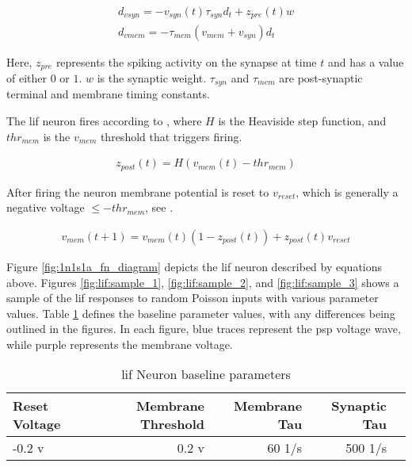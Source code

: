\begin{align}
d_{vsyn} = -v_{syn}(t) \tau_{syn} d_t + z_{pre}(t) w \label{eq:lif:psp} \\
d_{vmem} = -\tau_{mem} (v_{mem} + v_{syn}) d_t \label{eq:lif:v}
\end{align}

Here, $z_{pre}$ represents the spiking activity on the synapse at time $t$ and
has a value of either $0$ or $1$. $w$ is the synaptic weight. $\tau_{syn}$ and
$\tau_{mem}$ are post-synaptic terminal and membrane timing constants.

The \gls{lif} neuron fires according to , where $H$ is the
Heaviside step function, and $thr_{mem}$ is the $v_{mem}$ threshold that
triggers firing.

\begin{align}
z_{post}(t) = H(v_{mem}(t) - thr_{mem}) \label{eq:lif:fire}
\end{align}

After firing the neuron membrane potential is reset to $v_{reset}$, which is
generally a negative voltage $\leq -thr_{mem}$, see .

\begin{align}
v_{mem}(t+1) = v_{mem}(t)(1 - z_{post}(t)) + z_{post}(t)v_{reset} \label{eq:lif:reset}
\end{align}

Figure \ref{fig:1n1s1a_fn_diagram} depicts the \gls{lif} neuron described by
equations above. Figures \ref{fig:lif:sample_1}, \ref{fig:lif:sample_2}, and
\ref{fig:lif:sample_3} shows a sample of the \gls{lif} responses to random
Poisson inputs with various parameter values. Table \ref{table:lif_params}
defines the baseline parameter values, with any differences being outlined in
the figures. In each figure, blue traces represent the \gls{psp} voltage wave,
while purple represents the membrane voltage.

\begin{table}[!htp]\centering
  \caption{\Gls{lif} Neuron baseline parameters} \label{table:lif_params}
  \scriptsize
  \begin{tabular}{lrrrr}\toprule
    Reset Voltage &Membrane Threshold &Membrane Tau &Synaptic Tau \\\midrule
    -0.2 v &0.2 v &60 1/s &500 1/s \\
    \bottomrule
  \end{tabular}
\end{table}


